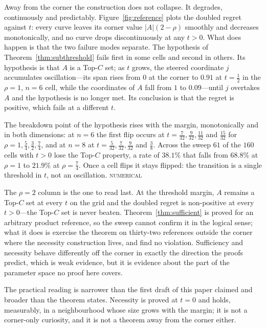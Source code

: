 \documentclass[conference]{IEEEtran}
\theoremstyle{definition}
\newcommand{\NUM}{\textsc{numerical}}
\begin{document}
Away from the corner the construction does not collapse. It degrades, continuously and
predictably. Figure~\ref{fig:reference} plots the doubled regret against $t$: every curve
leaves its corner value $|A|(2-\rho)$ smoothly and decreases monotonically, and no curve
drops discontinuously at any $t>0$. What does happen is that the two failure modes separate.
The hypothesis of Theorem~\ref{thm:subthreshold} fails first in some cells and second in
others. Its hypothesis is that $A$ is a Top-$C$ set; as $t$ grows, the steered coordinate $j$
accumulates oscillation---its span rises from $0$ at the corner to $0.91$ at $t=\tfrac12$ in
the $\rho=1$, $n=6$ cell, while the coordinates of $A$ fall from $1$ to $0.09$---until $j$
overtakes $A$ and the hypothesis is no longer met. Its conclusion is that the regret is
positive, which fails at a different $t$.

The breakdown point of the hypothesis rises with the margin, monotonically and in both
dimensions: at $n=6$ the first flip occurs at $t=\tfrac{7}{32},\tfrac{9}{32},\tfrac{11}{32}$
and $\tfrac{15}{32}$ for $\rho=1,\tfrac54,\tfrac32,\tfrac74$, and at $n=8$ at
$t=\tfrac{5}{32},\tfrac{7}{32},\tfrac{9}{32}$ and $\tfrac38$. Across the sweep $61$ of the
$160$ cells with $t>0$ lose the Top-$C$ property, a rate of $38.1\%$ that falls from $68.8\%$
at $\rho=1$ to $21.9\%$ at $\rho=\tfrac74$. Once a cell flips it stays flipped: the
transition is a single threshold in $t$, not an oscillation. \NUM{}

The $\rho=2$ column is the one to read last. At the threshold margin, $A$ remains a Top-$C$
set at every $t$ on the grid and the doubled regret is non-positive at every $t>0$---the
Top-$C$ set is never beaten. Theorem~\ref{thm:sufficient} is proved for an arbitrary product
reference, so the sweep cannot confirm it in the logical sense; what it does is exercise the
theorem on thirty-two references outside the corner where the necessity construction lives,
and find no violation. Sufficiency and necessity behave differently off the corner in exactly
the direction the proofs predict, which is weak evidence, but it is evidence about the part of
the parameter space no proof here covers.

The practical reading is narrower than the first draft of this paper claimed and broader than
the theorem states. Necessity is proved at $t=0$ and holds, measurably, in a neighbourhood
whose size grows with the margin; it is not a corner-only curiosity, and it is not a theorem
away from the corner either.
\end{document}
